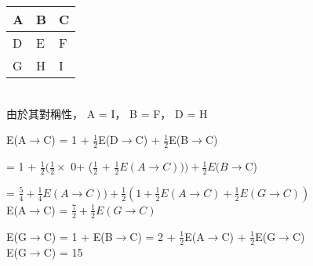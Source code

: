 \documentclass{article}
\begin{document}
\fontsize{13pt}{20pt}\selectfont

\begin{CJK}{UTF8}{bsmi} %
\begin{tabular}[t]{|l|l|l|}
\hline


A & B & C\\
\hline
D & E & F\\
\hline
G & H & I \\
\hline
\end{tabular} 
\\


由於其對稱性， A = I， B = F， D = H

\noindent
E(A$\rightarrow$C) = 1 + $\frac{1}{2}$E(D$\rightarrow$C) + $\frac{1}{2}$E(B$\rightarrow$C)

= 1 + $\frac{1}{2}(\frac{1}{2} \times$ 0+ ($\frac{1}{2}$ + $\frac{1}{2}E(A\rightarrow C))) + \frac{1}{2}E(B \rightarrow$C)

= $\frac{5}{4} + \frac{1}{4}E(A\rightarrow C)) + \frac{1}{2}(1+\frac{1}{2}E(A\rightarrow C) + \frac{1}{2}E(G\rightarrow C))$\\
E(A$\rightarrow$C) = $\frac{7}{2} + \frac{1}{2}E(G\rightarrow C)$

\noindent
E(G$\rightarrow$C) = 1 + E(B$\rightarrow$C)
= 2 + $\frac{1}{2}$E(A$\rightarrow$C) + $\frac{1}{2}$E(G$\rightarrow$C)\\
E(G$\rightarrow$C) = 15
\end{CJK} %
\end{document}
